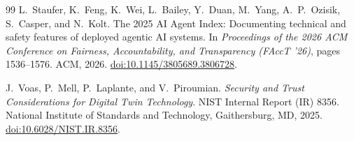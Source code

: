 \documentclass[11pt]{article}
\theoremstyle{plain}
\theoremstyle{definition}
\theoremstyle{remark}
\begin{document}
\begin{thebibliography}{99}
  L.\ Staufer, K.\ Feng, K.\ Wei, L.\ Bailey, Y.\ Duan, M.\ Yang, A.\ P.\ Ozisik, S.\ Casper, and N.\ Kolt.
  The 2025 AI Agent Index: Documenting technical and safety features of deployed agentic AI systems.
  In \emph{Proceedings of the 2026 ACM Conference on Fairness, Accountability, and Transparency (FAccT '26)}, pages 1536--1576. ACM, 2026.
  \href{https://doi.org/10.1145/3805689.3806728}{doi:10.1145/3805689.3806728}.

  J.\ Voas, P.\ Mell, P.\ Laplante, and V.\ Piroumian.
  \emph{Security and Trust Considerations for Digital Twin Technology}.
  NIST Internal Report (IR) 8356.
  National Institute of Standards and Technology, Gaithersburg, MD, 2025.
  \href{https://doi.org/10.6028/NIST.IR.8356}{doi:10.6028/NIST.IR.8356}.

\end{thebibliography}
\end{document}
